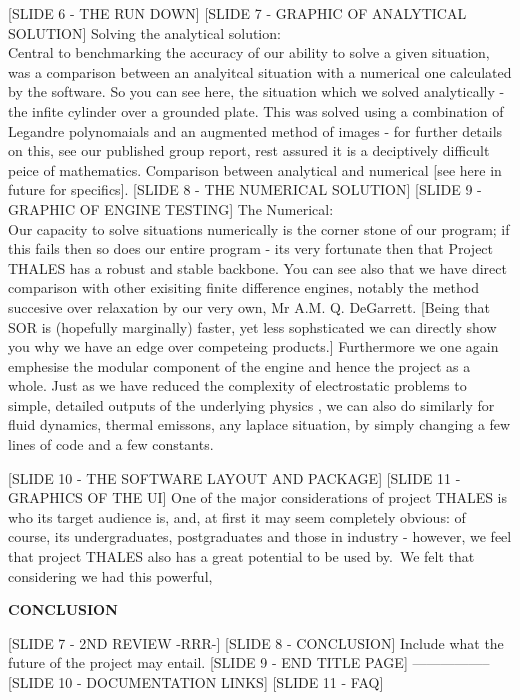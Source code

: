 \documentclass{article}
\begin{document}
[SLIDE 6 - THE RUN DOWN]
[SLIDE 7 - GRAPHIC OF ANALYTICAL SOLUTION]
Solving the analytical solution:\\
Central to benchmarking the accuracy of our ability to solve a given situation, was a comparison between an analyitcal situation with a numerical
one calculated by the software. So you can see here, the situation which we solved analytically - the infite cylinder over a grounded plate. This
was solved using a combination of Legandre polynomaials and an augmented method of images - for further details on this, see our published 
group report, rest assured it is a deciptively difficult peice of mathematics. Comparison between analytical and numerical [see here in future 
for specifics].
[SLIDE 8 - THE NUMERICAL SOLUTION]
[SLIDE 9 - GRAPHIC OF ENGINE TESTING]
The Numerical:\\
Our capacity to solve situations numerically is the corner stone of our program; if this fails then so does our entire program - its very fortunate then
that Project THALES has a robust and stable backbone. You can see also that we have direct comparison with other exisiting finite difference engines,
notably the method succesive over relaxation by our very own, Mr A.M. Q. DeGarrett. [Being that SOR is (hopefully marginally) faster, yet less 
sophsticated we can directly show you why we have an edge over competeing products.] Furthermore we one again emphesise the modular component of the 
engine and hence the project as a whole. Just as we have reduced the complexity of electrostatic problems to simple, detailed outputs of the
underlying physics , we can also do similarly for fluid dynamics, thermal emissons, any laplace situation, by simply changing a few lines of code
and a few constants.

[SLIDE 10 - THE SOFTWARE LAYOUT AND PACKAGE]
[SLIDE 11 - GRAPHICS OF THE UI]
One of the major considerations of project THALES is who its target audience is, and, at first it may seem completely obvious: of course, its
undergraduates, postgraduates and those in industry - however, we feel that project THALES also has a great potential to be used by.\
We felt that considering we had this powerful,   


\begin{center}
\textbf{CONCLUSION}\\
\end{center}


[SLIDE 7 - 2ND REVIEW -RRR-]
[SLIDE 8 - CONCLUSION]
Include what the future of the project may entail.
[SLIDE 9 - END TITLE PAGE]
-----------------
[SLIDE 10 - DOCUMENTATION LINKS]
[SLIDE 11 - FAQ]
\end{document}
